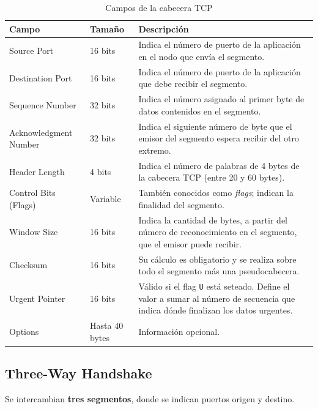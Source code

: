 \begin{table}[H]
    \centering
    \caption{Campos de la cabecera TCP}
    \label{tab:campos-tcp}
    \renewcommand{\arraystretch}{1.2}
    \begin{tabular}{|p{}|p{}|p{}|}
        \hline
        \textbf{Campo} & \textbf{Tamaño} & \textbf{Descripción} \\ \hline
        Source Port & 16 bits & Indica el número de puerto de la aplicación en el nodo que envía el segmento. \\ \hline
        Destination Port & 16 bits & Indica el número de puerto de la aplicación que debe recibir el segmento. \\ \hline
        Sequence Number & 32 bits & Indica el número asignado al primer byte de datos contenidos en el segmento. \\ \hline
        Acknowledgment Number & 32 bits & Indica el siguiente número de byte que el emisor del segmento espera recibir del otro extremo. \\ \hline
        Header Length & 4 bits & Indica el número de palabras de 4 bytes de la cabecera TCP (entre 20 y 60 bytes). \\ \hline
        Control Bits (Flags) & Variable & También conocidos como \textit{flags}; indican la finalidad del segmento. \\ \hline
        Window Size & 16 bits & Indica la cantidad de bytes, a partir del número de reconocimiento en el segmento, que el emisor puede recibir. \\ \hline
        Checksum & 16 bits & Su cálculo es obligatorio y se realiza sobre todo el segmento más una pseudocabecera. \\ \hline
        Urgent Pointer & 16 bits & Válido si el flag \texttt{U} está seteado. Define el valor a sumar al número de secuencia que indica dónde finalizan los datos urgentes. \\ \hline
        Options & Hasta 40 bytes & Información opcional. \\ \hline
    \end{tabular}
\end{table}

\subsection{Three-Way Handshake}

Se intercambian \textbf{tres segmentos}, donde se indican puertos origen y destino.

